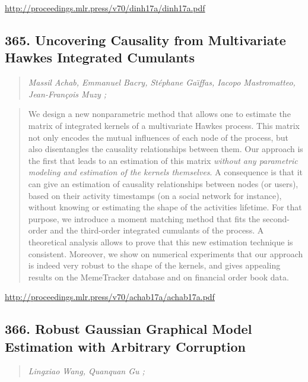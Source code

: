 \documentclass{article}
\begin{document}
\href{http://proceedings.mlr.press/v70/dinh17a/dinh17a.pdf}{http://proceedings.mlr.press/v70/dinh17a/dinh17a.pdf}

\subsection{365. Uncovering Causality from Multivariate Hawkes Integrated Cumulants}

\begin{quote}
\footnotesize{\textit{Massil Achab, Emmanuel Bacry, Stéphane Gaı̈ffas, Iacopo Mastromatteo, Jean-François Muzy ;}}
\end{quote}

\begin{quote}
    We design a new nonparametric method that allows one to estimate the matrix of integrated kernels of a multivariate Hawkes process. This matrix not only encodes the mutual influences of each node of the process, but also disentangles the causality relationships between them. Our approach is the first that leads to an estimation of this matrix \textit{without any parametric modeling and estimation of the kernels themselves}. A consequence is that it can give an estimation of causality relationships between nodes (or users), based on their activity timestamps (on a social network for instance), without knowing or estimating the shape of the activities lifetime. For that purpose, we introduce a moment matching method that fits the second-order and the third-order integrated cumulants of the process. A theoretical analysis allows to prove that this new estimation technique is consistent. Moreover, we show on numerical experiments that our approach is indeed very robust to the shape of the kernels, and gives appealing results on the MemeTracker database and on financial order book data.  \end{quote}

\href{http://proceedings.mlr.press/v70/achab17a/achab17a.pdf}{http://proceedings.mlr.press/v70/achab17a/achab17a.pdf}

\subsection{366. Robust Gaussian Graphical Model Estimation with Arbitrary Corruption}

\begin{quote}
\footnotesize{\textit{Lingxiao Wang, Quanquan Gu ;}}
\end{quote}
\end{document}
